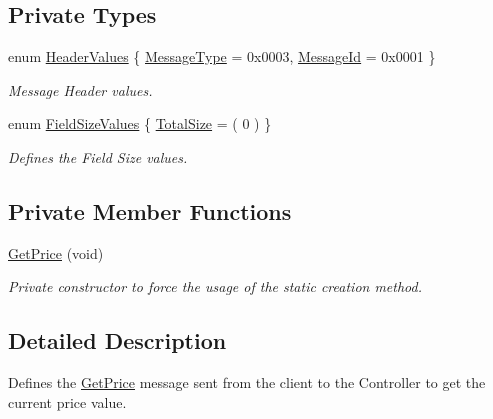 \subsection*{Private Types}
\begin{DoxyCompactItemize}
\item 
enum \hyperlink{class_terra_swarm_1_1_synchronous_1_1_get_price_a753a713a664ad54645f58aa349d74017}{Header\-Values} \{ \hyperlink{class_terra_swarm_1_1_synchronous_1_1_get_price_a753a713a664ad54645f58aa349d74017a08ca4ff2a63b1d19e7ac3fc9dbc247fb}{Message\-Type} = 0x0003, 
\hyperlink{class_terra_swarm_1_1_synchronous_1_1_get_price_a753a713a664ad54645f58aa349d74017a2719f42b8dc56e4b37b8e0a3d63936e8}{Message\-Id} = 0x0001
 \}
\begin{DoxyCompactList}\small\item\em Message Header values. \end{DoxyCompactList}\item 
enum \hyperlink{class_terra_swarm_1_1_synchronous_1_1_get_price_ac675c3af37b1b76c0af699178c4fbe06}{Field\-Size\-Values} \{ \hyperlink{class_terra_swarm_1_1_synchronous_1_1_get_price_ac675c3af37b1b76c0af699178c4fbe06a6bd2ff634603aa756193e870db6762d7}{Total\-Size} = ( 0 )
 \}
\begin{DoxyCompactList}\small\item\em Defines the Field Size values. \end{DoxyCompactList}\end{DoxyCompactItemize}
\subsection*{Private Member Functions}
\begin{DoxyCompactItemize}
\item 
\hyperlink{class_terra_swarm_1_1_synchronous_1_1_get_price_ab0eb094bba4cdd8d67b93373db2fa2a6}{Get\-Price} (void)
\begin{DoxyCompactList}\small\item\em Private constructor to force the usage of the static creation method. \end{DoxyCompactList}\end{DoxyCompactItemize}


\subsection{Detailed Description}
Defines the \hyperlink{class_terra_swarm_1_1_synchronous_1_1_get_price}{Get\-Price} message sent from the client to the Controller to get the current price value. 

